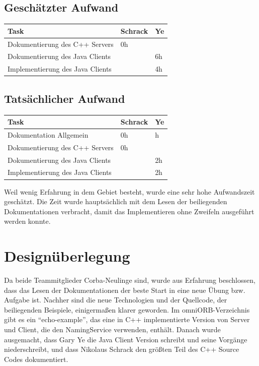 \documentclass[11pt]{article}
\begin{document}
\subsection{Geschätzter Aufwand}

\begin{center}
  \begin{tabular}{| l | l | l |}
    \hline
    Task & Schrack & Ye \\ \hline

    Dokumentierung des C++ Servers   & 0h & \\ \hline
    Dokumentierung des Java Clients  & & 6h \\ \hline
    Implementierung des Java Clients & & 4h \\ \hline
  \end{tabular}
\end{center}

\subsection{Tatsächlicher Aufwand}
\begin{center}
  \begin{tabular}{| l | l | l |}
    \hline
    Task & Schrack & Ye \\ \hline
    Dokumentation Allgemein          & 0h & h \\ \hline
    Dokumentierung des C++ Servers   & 0h & \\ \hline
    Dokumentierung des Java Clients  & & 2h \\ \hline
    Implementierung des Java Clients & & 2h \\ \hline
  \end{tabular}
\end{center}

Weil wenig Erfahrung in dem Gebiet besteht, wurde eine sehr hohe Aufwandszeit geschätzt. Die Zeit wurde hauptsächlich mit dem Lesen der beiliegenden Dokumentationen verbracht, damit das Implementieren ohne Zweifeln ausgeführt werden konnte.

\section{Designüberlegung}
Da beide Teammitglieder Corba-Neulinge sind, wurde aus Erfahrung beschlossen, dass das Lesen der Dokumentationen der beste Start in eine neue Übung bzw. Aufgabe ist. Nachher sind die neue Technologien und der Quellcode, der beiliegenden Beispiele, einigermaßen klarer geworden. Im omniORB-Verzeichnis gibt es ein ``echo-example'', das eine in C++ implementierte Version von Server und Client, die den NamingService verwenden, enthält. Danach wurde ausgemacht, dass Gary Ye die Java Client Version schreibt und seine Vorgänge niederschreibt, und dass Nikolaus Schrack den größten Teil des C++ Source Codes dokumentiert. 
\end{document}
